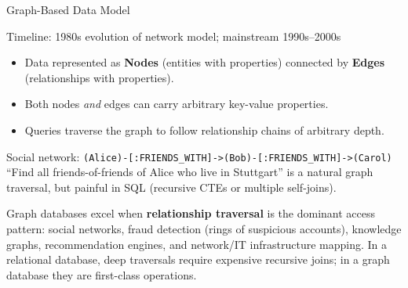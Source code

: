 \begin{frame}{Graph-Based Data Model}
  \begin{block}{Timeline: 1980s evolution of network model; mainstream 1990s--2000s}
    \begin{itemize}
      \item Data represented as \textbf{Nodes} (entities with properties)
            connected by \textbf{Edges} (relationships with properties).
      \item Both nodes \emph{and} edges can carry arbitrary key-value properties.
      \item Queries traverse the graph to follow relationship chains of
            arbitrary depth.
    \end{itemize}
  \end{block}

  \begin{examples}{}
    Social network: \texttt{(Alice)-[:FRIENDS\_WITH]->(Bob)-[:FRIENDS\_WITH]->(Carol)}\\
    ``Find all friends-of-friends of Alice who live in Stuttgart'' is a
    natural graph traversal, but painful in SQL (recursive CTEs or
    multiple self-joins).
  \end{examples}

  Graph databases excel when \textbf{relationship traversal} is the dominant
  access pattern: social networks, fraud detection (rings of suspicious
  accounts), knowledge graphs, recommendation engines, and network/IT
  infrastructure mapping.  In a relational database, deep traversals require
  expensive recursive joins; in a graph database they are first-class operations.
\end{frame}

